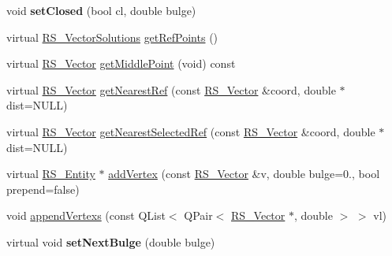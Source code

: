 \begin{DoxyCompactItemize}
\item 
\hypertarget{classRS__Polyline_a5071f13c9537fc0b1bde7d785bd4816e}{void {\bfseries set\-Closed} (bool cl, double bulge)}\label{classRS__Polyline_a5071f13c9537fc0b1bde7d785bd4816e}

\item 
virtual \hyperlink{classRS__VectorSolutions}{R\-S\-\_\-\-Vector\-Solutions} \hyperlink{classRS__Polyline_aa61dc907ef597ec2b42d068ac6e328a1}{get\-Ref\-Points} ()
\item 
virtual \hyperlink{classRS__Vector}{R\-S\-\_\-\-Vector} \hyperlink{classRS__Polyline_a8dfa2bb88d14e2c729fb0cfdad441975}{get\-Middle\-Point} (void) const 
\item 
virtual \hyperlink{classRS__Vector}{R\-S\-\_\-\-Vector} \hyperlink{classRS__Polyline_a605bca14ffe5066e029d749027756cee}{get\-Nearest\-Ref} (const \hyperlink{classRS__Vector}{R\-S\-\_\-\-Vector} \&coord, double $\ast$dist=N\-U\-L\-L)
\item 
virtual \hyperlink{classRS__Vector}{R\-S\-\_\-\-Vector} \hyperlink{classRS__Polyline_ad686d9777394211bbb1894f98ed030b8}{get\-Nearest\-Selected\-Ref} (const \hyperlink{classRS__Vector}{R\-S\-\_\-\-Vector} \&coord, double $\ast$dist=N\-U\-L\-L)
\item 
virtual \hyperlink{classRS__Entity}{R\-S\-\_\-\-Entity} $\ast$ \hyperlink{classRS__Polyline_aafe7c06c86ae3c451851cf129859fc7d}{add\-Vertex} (const \hyperlink{classRS__Vector}{R\-S\-\_\-\-Vector} \&v, double bulge=0., bool prepend=false)
\item 
void \hyperlink{classRS__Polyline_ab22e5f800e2e2fca601ab012f892f613}{append\-Vertexs} (const Q\-List$<$ Q\-Pair$<$ \hyperlink{classRS__Vector}{R\-S\-\_\-\-Vector} $\ast$, double $>$ $>$ vl)
\item 
\hypertarget{classRS__Polyline_a599fd8c25dd4ee52856c73b9f28a1d2e}{virtual void {\bfseries set\-Next\-Bulge} (double bulge)}\label{classRS__Polyline_a599fd8c25dd4ee52856c73b9f28a1d2e}


\end{DoxyCompactItemize}
